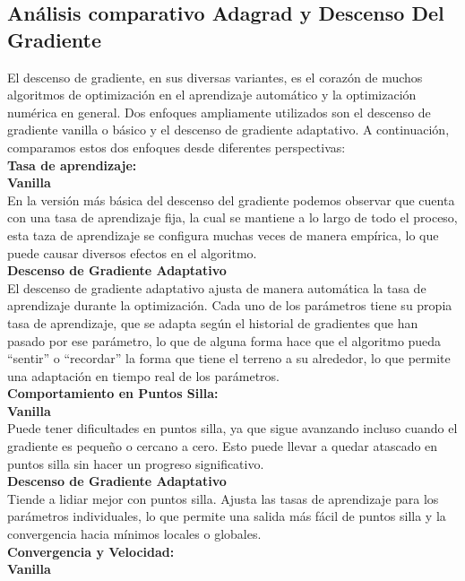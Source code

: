 \subsection{Análisis comparativo Adagrad y Descenso Del Gradiente}
El descenso de gradiente, en sus diversas variantes, es el corazón de muchos algoritmos de optimización en el aprendizaje automático y la optimización numérica en general. Dos enfoques ampliamente utilizados son el descenso de gradiente vanilla o básico y el descenso de gradiente adaptativo. A continuación, comparamos estos dos enfoques desde diferentes perspectivas:
\\
\textbf{Tasa de aprendizaje:}\\
\textbf{Vanilla}\\
En la versión más básica del descenso del gradiente podemos observar que cuenta con una tasa de aprendizaje fija, la cual se mantiene a lo largo de todo el proceso, esta taza de aprendizaje se configura muchas veces de manera empírica, lo que puede causar diversos efectos en el algoritmo. 
\\
\textbf{Descenso de Gradiente Adaptativo}\\
El descenso de gradiente adaptativo ajusta de manera automática la tasa de aprendizaje durante la optimización. Cada uno de los parámetros tiene su propia tasa de aprendizaje, que se adapta según el historial de gradientes que han pasado por ese parámetro, lo que de alguna forma hace que el algoritmo pueda ``sentir'' o ``recordar'' la forma que tiene el terreno a su alrededor, lo que permite una adaptación en tiempo real de los parámetros. 
\\
\textbf{Comportamiento en Puntos Silla:}\\
\textbf{Vanilla}\\
Puede tener dificultades en puntos silla, ya que sigue avanzando incluso cuando el gradiente es pequeño o cercano a cero. Esto puede llevar a quedar atascado en puntos silla sin hacer un progreso significativo.
\\
\textbf{Descenso de Gradiente Adaptativo}\\
Tiende a lidiar mejor con puntos silla. Ajusta las tasas de aprendizaje para los parámetros individuales, lo que permite una salida más fácil de puntos silla y la convergencia hacia mínimos locales o globales.
\\
\textbf{Convergencia y Velocidad:}\\
\textbf{Vanilla}\\
